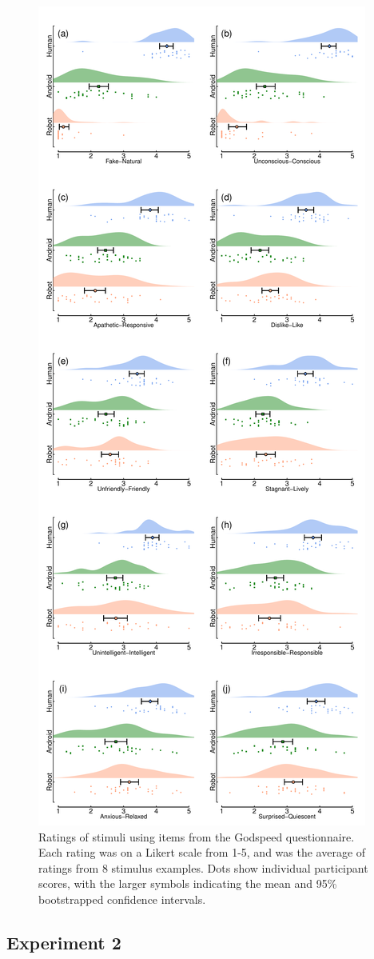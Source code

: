 \documentclass[
]{article}
\begin{document}
\begin{figure}

{\centering \includegraphics[width=0.5\linewidth]{Figures/RobotRatings} 

}

\caption{Ratings of stimuli using items from the Godspeed questionnaire. Each rating was on a Likert scale from 1-5, and was the average of ratings from 8 stimulus examples. Dots show individual participant scores, with the larger symbols indicating the mean and 95\% bootstrapped confidence intervals.}\label{fig:robotratings}
\end{figure}

\subsection{Experiment 2}\label{experiment-2}
\end{document}
